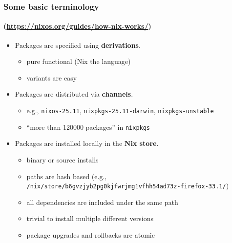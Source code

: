 \documentclass[nochapters]{otagoslides}
\begin{document}
\begin{frame}
    \frametitle{Some basic terminology}
    \framesubtitle{(\url{https://nixos.org/guides/how-nix-works/})}

    \begin{itemize}
        \item Packages are specified using \textbf{derivations}.
        \begin{itemize}
            \item pure functional (Nix the language)
            \item variants are easy
        \end{itemize}
        \item Packages are distributed via \textbf{channels}.
        \begin{itemize}
            \item e.g., \texttt{nixos-25.11}, \texttt{nixpkgs-25.11-darwin}, \texttt{nixpkgs-unstable}
            \item ``more than \num{120000} packages'' in \texttt{nixpkgs}
        \end{itemize}
        \item Packages are installed locally in the \textbf{Nix store}.
        \begin{itemize}
            \item binary or source installs
            \item paths are hash based {\tiny (e.g., \texttt{/nix/store/b6gvzjyb2pg0kjfwrjmg1vfhh54ad73z-firefox-33.1/})}
            \item all dependencies are included under the same path
            \item trivial to install multiple different versions
            \item package upgrades and rollbacks are atomic
        \end{itemize}
    \end{itemize}
\end{frame}
\end{document}
